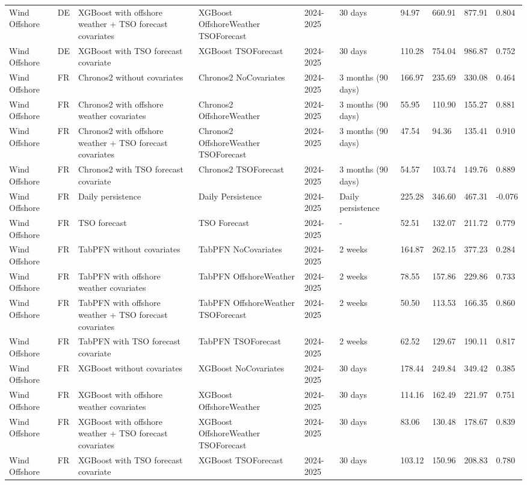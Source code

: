 \begin{longtable}{llllllllll}
Wind Offshore & DE & XGBoost with offshore weather + TSO forecast covariates & XGBoost OffshoreWeather TSOForecast & 2024-2025 & 30 days & 94.97 & 660.91 & 877.91 & 0.804 \\
Wind Offshore & DE & XGBoost with TSO forecast covariate & XGBoost TSOForecast & 2024-2025 & 30 days & 110.28 & 754.04 & 986.87 & 0.752 \\
Wind Offshore & FR & Chronos2 without covariates & Chronos2 NoCovariates & 2024-2025 & 3 months (90 days) & 166.97 & 235.69 & 330.08 & 0.464 \\
Wind Offshore & FR & Chronos2 with offshore weather covariates & Chronos2 OffshoreWeather & 2024-2025 & 3 months (90 days) & 55.95 & 110.90 & 155.27 & 0.881 \\
Wind Offshore & FR & Chronos2 with offshore weather + TSO forecast covariates & Chronos2 OffshoreWeather TSOForecast & 2024-2025 & 3 months (90 days) & 47.54 & 94.36 & 135.41 & 0.910 \\
Wind Offshore & FR & Chronos2 with TSO forecast covariate & Chronos2 TSOForecast & 2024-2025 & 3 months (90 days) & 54.57 & 103.74 & 149.76 & 0.889 \\
Wind Offshore & FR & Daily persistence & Daily Persistence & 2024-2025 & Daily persistence & 225.28 & 346.60 & 467.31 & -0.076 \\
Wind Offshore & FR & TSO forecast & TSO Forecast & 2024-2025 & - & 52.51 & 132.07 & 211.72 & 0.779 \\
Wind Offshore & FR & TabPFN without covariates & TabPFN NoCovariates & 2024-2025 & 2 weeks & 164.87 & 262.15 & 377.23 & 0.284 \\
Wind Offshore & FR & TabPFN with offshore weather covariates & TabPFN OffshoreWeather & 2024-2025 & 2 weeks & 78.55 & 157.86 & 229.86 & 0.733 \\
Wind Offshore & FR & TabPFN with offshore weather + TSO forecast covariates & TabPFN OffshoreWeather TSOForecast & 2024-2025 & 2 weeks & 50.50 & 113.53 & 166.35 & 0.860 \\
Wind Offshore & FR & TabPFN with TSO forecast covariate & TabPFN TSOForecast & 2024-2025 & 2 weeks & 62.52 & 129.67 & 190.11 & 0.817 \\
Wind Offshore & FR & XGBoost without covariates & XGBoost NoCovariates & 2024-2025 & 30 days & 178.44 & 249.84 & 349.42 & 0.385 \\
Wind Offshore & FR & XGBoost with offshore weather covariates & XGBoost OffshoreWeather & 2024-2025 & 30 days & 114.16 & 162.49 & 221.97 & 0.751 \\
Wind Offshore & FR & XGBoost with offshore weather + TSO forecast covariates & XGBoost OffshoreWeather TSOForecast & 2024-2025 & 30 days & 83.06 & 130.48 & 178.67 & 0.839 \\
Wind Offshore & FR & XGBoost with TSO forecast covariate & XGBoost TSOForecast & 2024-2025 & 30 days & 103.12 & 150.96 & 208.83 & 0.780 \\
\end{longtable}
